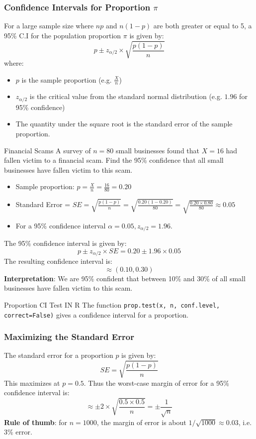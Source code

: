 \documentclass[10pt, total={6in, 8in}]{extarticle}
\begin{document}
\subsubsection{Confidence Intervals for Proportion $\pi$}
For a large sample size where $np$ and $n(1-p)$ are both greater or equal to 5, a 95\% C.I for the population proportion $\pi$ is given by:
$$p \pm z_{\alpha/2} \times \sqrt{\frac{p(1 - p)}{n}}$$
where:
\begin{itemize}
    \item $p$ is the sample proportion (e.g. $\frac{X}{n}$)
    \item $z_{\alpha/2}$ is the critical value from the standard normal distribution (e.g. $1.96$ for 95\% confidence)
    \item The quantity under the square root is the standard error of the sample proportion.
\end{itemize}

\begin{examplebox}{Financial Scams}{}
    A survey of $n=80$ small businesses found that $X = 16$ had fallen victim to a financial scam. Find the 95\% confidence that all small businesses have fallen victim to this scam. \\[2ex]

    \begin{itemize}
        \item Sample proportion: $p = \frac{X}{n} = \frac{16}{80} = 0.20$
        \item Standard Error = $SE = \sqrt{\frac{p(1 - p)}{n}} = \sqrt{\frac{0.20(1 - 0.20)}{80}} = \sqrt{\frac{0.20 \times 0.80}{80}} \approx 0.05$
        \item For a 95\% confidence interval $\alpha = 0.05, z_{\alpha/2} = 1.96$.
    \end{itemize}
    The 95\% confidence interval is given by:
    $$p \pm z_{\alpha/2} \times SE = 0.20 \pm 1.96 \times 0.05$$
    The resulting confidence interval is:
    $$\approx (0.10, 0.30)$$
    \textbf{Interpretation}: We are 95\% confident that between 10\% and 30\% of all small businesses have fallen victim to this scam.
\end{examplebox}
\begin{conceptbox}{Proportion CI Test IN R}{}
    The function \texttt{prop.test(x, n, conf.level, correct=False)}  gives a confidence interval for a proportion.
\end{conceptbox}

\subsubsection{Maximizing the Standard Error}
The standard error for a proportion $p$ is given by:
$$SE = \sqrt{\frac{p(1 - p)}{n}}$$
This maximizes at $p = 0.5$. Thus the worst-case margin of error for a 95\% confidence interval is:
$$\approx \pm 2 \times \sqrt{\frac{0.5\times0.5}{n}} = \pm \frac{1}{\sqrt{n}}$$
\textbf{Rule of thumb}: for $n = 1000$, the margin of error is about $1/\sqrt{1000} \approx 0.03$, i.e. 3\% error.
\end{document}

